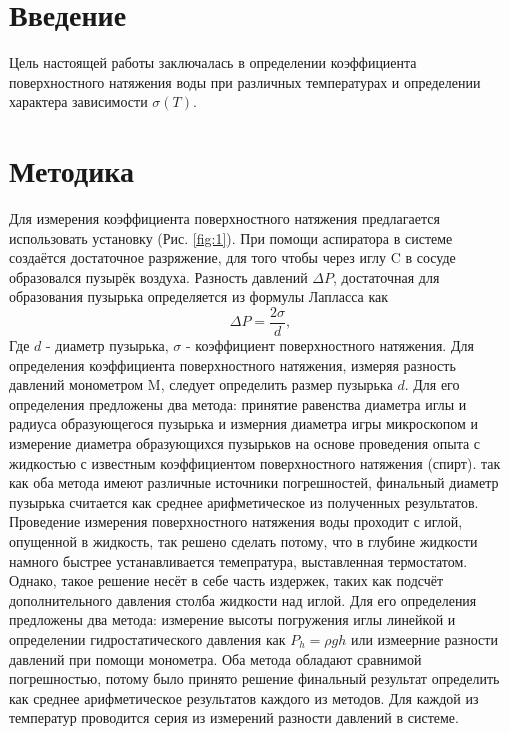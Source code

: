 \documentclass[a4paper,12pt]{report}
\begin{document}
\begin{multicols}{2}

\section{Введение}
Цель настоящей работы заключалась в определении коэффициента поверхностного натяжения воды при различных температурах и 
определении характера зависимости $\sigma(T)$.  

\section{Методика}
Для измерения коэффициента поверхностного натяжения предлагается использовать установку (Рис. \ref{fig:1}). 
При помощи аспиратора в системе создаётся достаточное разряжение, для того чтобы через иглу C в сосуде 
образовался пузырёк воздуха. Разность давлений $\Delta P$, достаточная для образования пузырька определяется из формулы Лапласса как 
\begin{equation}
    \Delta P = \frac{2\sigma}{d},
    \label{eq:1}
\end{equation}
Где $d$ - диаметр пузырька, $\sigma$ - коэффициент поверхностного натяжения. Для определения коэффициента 
поверхностного натяжения, измеряя разность давлений монометром M, следует определить размер пузырька $d$. 
Для его определения предложены два метода: принятие равенства диаметра иглы и радиуса образующегося пузырька и измерния диаметра игры микроскопом и 
измерение диаметра образующихся пузырьков на основе проведения опыта с жидкостью с известным коэффициентом поверхностного натяжения (спирт). так как оба метода 
имеют различные источники погрешностей, финальный диаметр пузырька считается как среднее арифметическое из полученных результатов. 
Проведение измерения поверхностного натяжения воды проходит с иглой, опущенной в жидкость, так решено сделать потому, что 
в глубине жидкости намного быстрее устанавливается темепратура, выставленная термостатом. Однако, такое решение несёт в себе часть издержек, 
таких как подсчёт дополнительного давления столба жидкости над иглой. Для его определения предложены два метода: 
измерение высоты погружения иглы линейкой и определении гидростатического давления как $P_h = \rho g h$ или 
измеерние разности давлений при помощи монометра. Оба метода обладают сравнимой погрешностью, потому было принято решение 
финальный результат определить как среднее арифметическое результатов каждого из методов. 
Для каждой из температур проводится серия из измерений разности давлений в системе.

\end{multicols}
\end{document}
